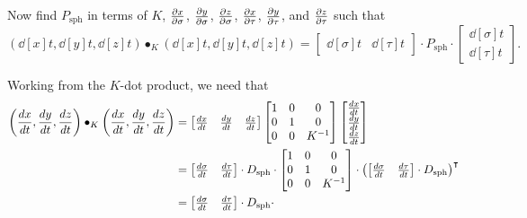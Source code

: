 \documentclass[newpage,hints,handout]{ximera}
\begin{document}
\begin{problem}
  Now find $P_\mathrm{sph}$ in terms of $K$, $\pp[x]{\sigma}$, $\pp[y]{\sigma}$,
  $\pp[z]{\sigma}$, $\pp[x]{\tau}$, $\pp[y]{\tau}$, and $\pp[z]{\tau}$
  such that
  \[
  \left(\dd[x]{t}, \dd[y]{t}, \dd[z]{t}\right)\bullet_K
  \left(\dd[x]{t}, \dd[y]{t}, \dd[z]{t}\right)
  =
  \begin{bmatrix}
    \dd[\sigma]{t} &  \dd[\tau]{t}
  \end{bmatrix}
  \cdot P_\mathrm{sph}
  \cdot
  \begin{bmatrix}
    \dd[\sigma]{t} \\  \dd[\tau]{t}
  \end{bmatrix}.
  \]
  \begin{freeResponse}
    Working from the $K$-dot product, we need that
    \begin{align*}
    \left(\dd[x]{t}, \dd[y]{t}, \dd[z]{t}\right)\bullet_K
    \left(\dd[x]{t}, \dd[y]{t}, \dd[z]{t}\right)
    &=
    \begin{bmatrix}
      \dd[x]{t} & \dd[y]{t} & \dd[z]{t}
    \end{bmatrix}
    \begin{bmatrix}
      1 & 0 & 0\\
      0 & 1 & 0\\
      0 & 0 & K^{-1}
    \end{bmatrix}
    \begin{bmatrix}
      \dd[x]{t} \\ \dd[y]{t} \\ \dd[z]{t}
    \end{bmatrix}\\
    &=
    \begin{bmatrix}
      \frac{d\sigma}{dt} & \frac{d\tau}{dt}
    \end{bmatrix}\cdot D_{\mathrm{sph}}\cdot
    \begin{bmatrix}
      1 & 0 & 0\\
      0 & 1 & 0\\
    0 & 0 & K^{-1}
    \end{bmatrix}
    \cdot
    \left(
    \begin{bmatrix}
      \frac{d\sigma}{dt} & \frac{d\tau}{dt}
    \end{bmatrix}\cdot D_{\mathrm{sph}}
    \right)^\transpose\\
    &=
    \begin{bmatrix}
      \frac{d\sigma}{dt} & \frac{d\tau}{dt}
    \end{bmatrix}\cdot D_{\mathrm{sph}}\cdot

\end{align*}
\end{freeResponse}
\end{problem}
\end{document}
